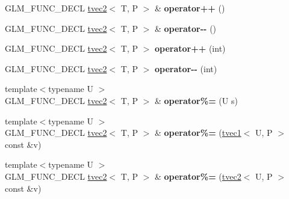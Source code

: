 \begin{DoxyCompactItemize}
\item 
\hypertarget{structglm_1_1tvec2_aee5dc4593579348b1f53ce6296337702}{G\-L\-M\-\_\-\-F\-U\-N\-C\-\_\-\-D\-E\-C\-L \hyperlink{structglm_1_1tvec2}{tvec2}$<$ T, P $>$ \& {\bfseries operator++} ()}\label{structglm_1_1tvec2_aee5dc4593579348b1f53ce6296337702}

\item 
\hypertarget{structglm_1_1tvec2_af751da3c19f0f22f8eb2bac9003f9384}{G\-L\-M\-\_\-\-F\-U\-N\-C\-\_\-\-D\-E\-C\-L \hyperlink{structglm_1_1tvec2}{tvec2}$<$ T, P $>$ \& {\bfseries operator-\/-\/} ()}\label{structglm_1_1tvec2_af751da3c19f0f22f8eb2bac9003f9384}

\item 
\hypertarget{structglm_1_1tvec2_ab479786d89c64c96e9611c7c93fb29c5}{G\-L\-M\-\_\-\-F\-U\-N\-C\-\_\-\-D\-E\-C\-L \hyperlink{structglm_1_1tvec2}{tvec2}$<$ T, P $>$ {\bfseries operator++} (int)}\label{structglm_1_1tvec2_ab479786d89c64c96e9611c7c93fb29c5}

\item 
\hypertarget{structglm_1_1tvec2_a4206b03754b7b3ba80a3a9365755f882}{G\-L\-M\-\_\-\-F\-U\-N\-C\-\_\-\-D\-E\-C\-L \hyperlink{structglm_1_1tvec2}{tvec2}$<$ T, P $>$ {\bfseries operator-\/-\/} (int)}\label{structglm_1_1tvec2_a4206b03754b7b3ba80a3a9365755f882}

\item 
\hypertarget{structglm_1_1tvec2_a29a67c2d6713e7ee90f30a8c1875fb96}{{\footnotesize template$<$typename U $>$ }\\G\-L\-M\-\_\-\-F\-U\-N\-C\-\_\-\-D\-E\-C\-L \hyperlink{structglm_1_1tvec2}{tvec2}$<$ T, P $>$ \& {\bfseries operator\%=} (U s)}\label{structglm_1_1tvec2_a29a67c2d6713e7ee90f30a8c1875fb96}

\item 
\hypertarget{structglm_1_1tvec2_a3750a63ccad2387d232a88a1abafa0aa}{{\footnotesize template$<$typename U $>$ }\\G\-L\-M\-\_\-\-F\-U\-N\-C\-\_\-\-D\-E\-C\-L \hyperlink{structglm_1_1tvec2}{tvec2}$<$ T, P $>$ \& {\bfseries operator\%=} (\hyperlink{structglm_1_1tvec1}{tvec1}$<$ U, P $>$ const \&v)}\label{structglm_1_1tvec2_a3750a63ccad2387d232a88a1abafa0aa}

\item 
\hypertarget{structglm_1_1tvec2_a3b939592b620fb6b0d7edd95c7863f0d}{{\footnotesize template$<$typename U $>$ }\\G\-L\-M\-\_\-\-F\-U\-N\-C\-\_\-\-D\-E\-C\-L \hyperlink{structglm_1_1tvec2}{tvec2}$<$ T, P $>$ \& {\bfseries operator\%=} (\hyperlink{structglm_1_1tvec2}{tvec2}$<$ U, P $>$ const \&v)}\label{structglm_1_1tvec2_a3b939592b620fb6b0d7edd95c7863f0d}


\end{DoxyCompactItemize}
